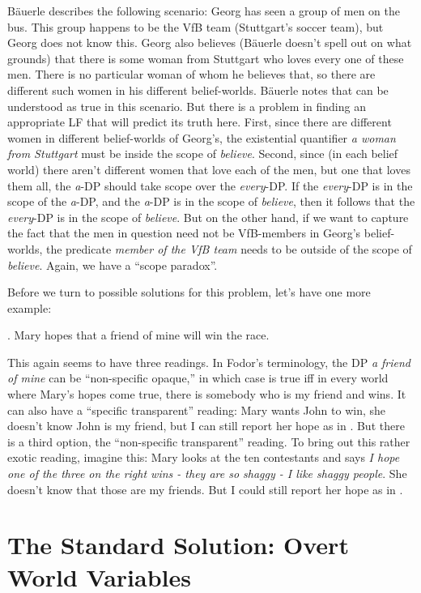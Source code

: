 Bäuerle describes the following scenario: Georg has seen a group of men on the bus. This group happens to be the VfB team (Stuttgart's soccer team), but Georg does not know this. Georg also believes (Bäuerle doesn't spell out on what grounds) that there is some woman from Stuttgart who loves every one of these men. There is no particular woman of whom he believes that, so there are different such women in his different belief-worlds. Bäuerle notes that \Last can be understood as true in this scenario. But there is a problem in finding an appropriate LF that will predict its truth here. First, since there are different women in different belief-worlds of Georg's, the existential quantifier \emph{a woman from Stuttgart} must be inside the scope of \emph{believe}. Second, since (in each belief world) there aren't different women that love each of the men, but one that loves them all, the \emph{a}-DP should take scope over the \emph{every}-DP. If the \emph{every}-DP is in the scope of the \emph{a}-DP, and the \emph{a}-DP is in the scope of \emph{believe}, then it follows that the \emph{every}-DP is in the scope of \emph{believe}. But on the other hand, if we want to capture the fact that the men in question need not be VfB-members in Georg's belief-worlds, the predicate \emph{member of the VfB team} needs to be outside of the scope of \emph{believe}. Again, we have a ``scope paradox''.

Before we turn to possible solutions for this problem, let's have one
more example:

\ex. Mary hopes that a friend of mine will win the race.

This again seems to have three readings. In Fodor's terminology, the DP \emph{a friend of mine} can be ``non-specific opaque,'' in which case \Last is true iff in every world where Mary's hopes come true, there is somebody who is my friend and wins. It can also have a ``specific transparent'' reading: Mary wants John to win, she doesn't know John is my friend, but I can still report her hope as in \Last. But there is a third option, the ``non-specific transparent'' reading. To bring out this rather exotic reading, imagine this: Mary looks at the ten contestants and says \emph{I hope one of the three on the right wins - they are so shaggy - I like shaggy people}. She doesn't know that those are my friends. But I could still report her hope as in \Last.

\section{The Standard Solution: Overt World Variables}

